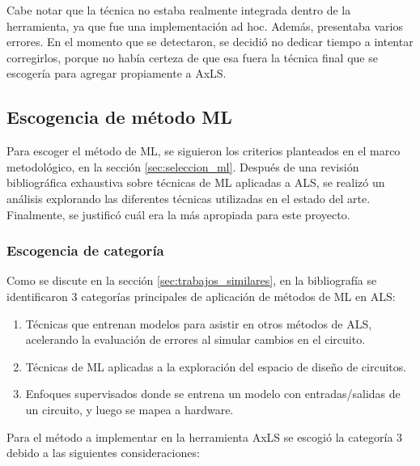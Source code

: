 Cabe notar que la técnica no estaba realmente integrada dentro de la
herramienta, ya que fue una implementación ad hoc. Además, presentaba varios
errores. En el momento que se detectaron, se decidió no dedicar tiempo a
intentar corregirlos, porque no había certeza de que esa fuera la técnica final
que se escogería para agregar propiamente a AxLS.

\subsection{Escogencia de método ML}

Para escoger el método de ML, se siguieron los criterios planteados en el marco
metodológico, en la sección \ref{sec:seleccion_ml}. Después de una revisión
bibliográfica exhaustiva sobre técnicas de ML aplicadas a ALS, se realizó un
análisis explorando las diferentes técnicas utilizadas en el estado del arte.
Finalmente, se justificó cuál era la más apropiada para este proyecto.

\subsubsection{Escogencia de categoría}

Como se discute en la sección \ref{sec:trabajos_similares}, en la bibliografía
se identificaron 3 categorías principales de aplicación de métodos de ML en
ALS:

\begin{enumerate}
  \item Técnicas que entrenan modelos para asistir en otros métodos de ALS,
    acelerando la evaluación de errores al simular cambios en el circuito.
  \item Técnicas de ML aplicadas a la exploración del espacio de diseño de
    circuitos.
  \item Enfoques supervisados donde se entrena un modelo con entradas/salidas
    de un circuito, y luego se mapea a hardware.
\end{enumerate}

Para el método a implementar en la herramienta AxLS se escogió la categoría 3
debido a las siguientes consideraciones:

